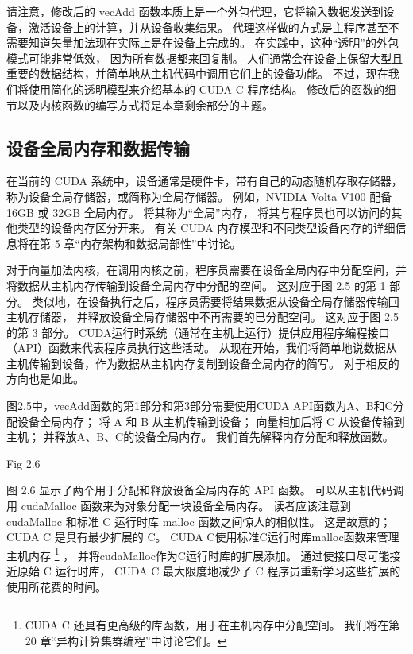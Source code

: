 请注意，修改后的 vecAdd 函数本质上是一个外包代理，它将输入数据发送到设备，激活设备上的计算，并从设备收集结果。 
代理这样做的方式是主程序甚至不需要知道矢量加法现在实际上是在设备上完成的。 在实践中，这种“透明”的外包模式可能非常低效，
因为所有数据都来回复制。 人们通常会在设备上保留大型且重要的数据结构，并简单地从主机代码中调用它们上的设备功能。 
不过，现在我们将使用简化的透明模型来介绍基本的 CUDA C 程序结构。 
修改后的函数的细节以及内核函数的编写方式将是本章剩余部分的主题。

\subsection{设备全局内存和数据传输}
在当前的 CUDA 系统中，设备通常是硬件卡，带有自己的动态随机存取存储器，称为设备全局存储器，或简称为全局存储器。 
例如，NVIDIA Volta V100 配备 16GB 或 32GB 全局内存。 将其称为“全局”内存，
将其与程序员也可以访问的其他类型的设备内存区分开来。 
有关 CUDA 内存模型和不同类型设备内存的详细信息将在第 5 章“内存架构和数据局部性”中讨论。

对于向量加法内核，在调用内核之前，程序员需要在设备全局内存中分配空间，并将数据从主机内存传输到设备全局内存中分配的空间。 
这对应于图 2.5 的第 1 部分。 类似地，在设备执行之后，程序员需要将结果数据从设备全局存储器传输回主机存储器，
并释放设备全局存储器中不再需要的已分配空间。 这对应于图 2.5 的第 3 部分。 
CUDA运行时系统（通常在主机上运行）提供应用程序编程接口（API）函数来代表程序员执行这些活动。 
从现在开始，我们将简单地说数据从主机传输到设备，作为数据从主机内存复制到设备全局内存的简写。 对于相反的方向也是如此。

图2.5中，vecAdd函数的第1部分和第3部分需要使用CUDA API函数为A、B和C分配设备全局内存； 
将 A 和 B 从主机传输到设备； 向量相加后将 C 从设备传输到主机； 并释放A、B、C的设备全局内存。
我们首先解释内存分配和释放函数。

{\color{red} Fig 2.6}

图 2.6 显示了两个用于分配和释放设备全局内存的 API 函数。 
可以从主机代码调用 cudaMalloc 函数来为对象分配一块设备全局内存。 
读者应该注意到 cudaMalloc 和标准 C 运行时库 malloc 函数之间惊人的相似性。 
这是故意的； CUDA C 是具有最少扩展的 C。 CUDA C使用标准C运行时库malloc函数来管理主机内存
\footnote{CUDA C 还具有更高级的库函数，用于在主机内存中分配空间。 我们将在第 20 章“异构计算集群编程”中讨论它们。} ，
并将cudaMalloc作为C运行时库的扩展添加。 通过使接口尽可能接近原始 C 运行时库，
CUDA C 最大限度地减少了 C 程序员重新学习这些扩展的使用所花费的时间。

